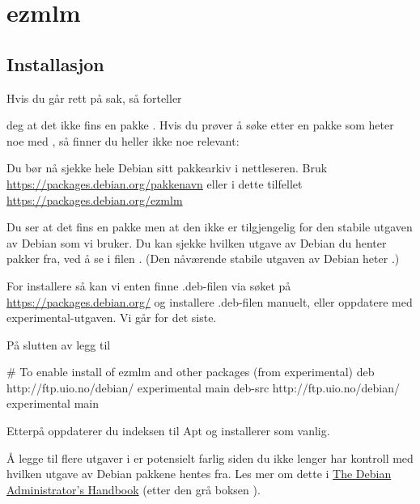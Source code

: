 \chapter{ezmlm} %

\section{Installasjon}

Hvis du går rett på sak, så forteller


deg at det ikke fins en pakke . Hvis du prøver å søke
etter en pakke som heter noe med , så finner du heller ikke noe relevant:


Du bør nå sjekke hele Debian sitt pakkearkiv i nettleseren. Bruk
\url{https://packages.debian.org/pakkenavn}
eller i dette tilfellet \url{https://packages.debian.org/ezmlm} 

Du ser at det fins en pakke  men at den ikke er tilgjengelig 
for den stabile utgaven av Debian som vi bruker. Du kan sjekke hvilken utgave 
av Debian du henter pakker fra, ved å se i filen . 
(Den nåværende stabile utgaven av Debian heter .)

For installere  så kan vi enten finne .deb-filen via søket på
\url{https://packages.debian.org/} og installere .deb-filen manuelt, 
eller oppdatere  med experimental-utgaven. Vi går for det siste.

På slutten av  legg til

\begin{filedata}
# To enable install of ezmlm and other packages (from experimental)
deb http://ftp.uio.no/debian/ experimental main
deb-src http://ftp.uio.no/debian/ experimental main
\end{filedata}

Etterpå oppdaterer du indeksen til Apt og installerer som vanlig.

\begin{remark}
Å legge til flere utgaver i  er potensielt farlig siden
du ikke lenger har kontroll med hvilken utgave av Debian pakkene hentes fra.
Les mer om dette i 
\href{https://debian-handbook.info/browse/stable/sect.apt-get.html\#sect.apt-upgrade}%
{The Debian Administrator's Handbook} (etter den grå boksen
).
\end{remark}

